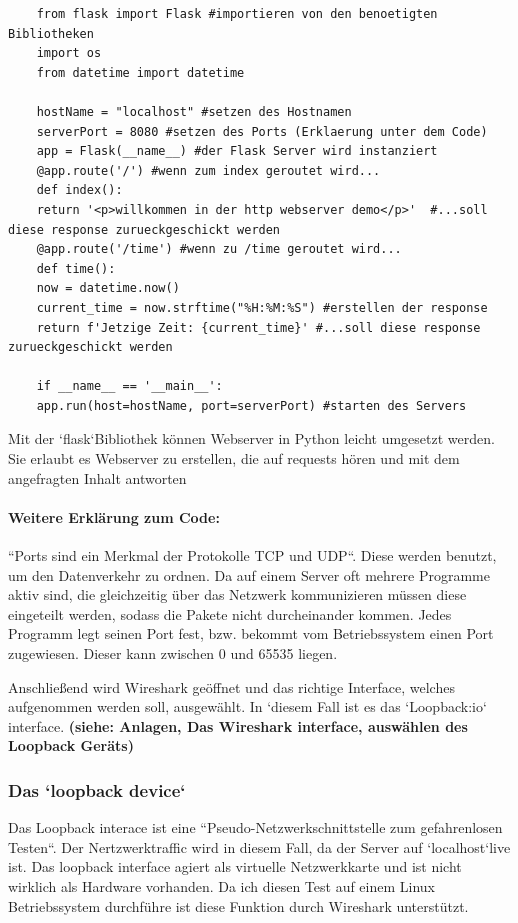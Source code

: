 \documentclass[12pt]{article}
\begin{document}
\begin{lstlisting}
	from flask import Flask #importieren von den benoetigten Bibliotheken
	import os
	from datetime import datetime
	
	hostName = "localhost" #setzen des Hostnamen
	serverPort = 8080 #setzen des Ports (Erklaerung unter dem Code)
	app = Flask(__name__) #der Flask Server wird instanziert
	@app.route('/') #wenn zum index geroutet wird...
	def index():
	return '<p>willkommen in der http webserver demo</p>'  #...soll diese response zurueckgeschickt werden
	@app.route('/time') #wenn zu /time geroutet wird...
	def time():
	now = datetime.now()
	current_time = now.strftime("%H:%M:%S") #erstellen der response
	return f'Jetzige Zeit: {current_time}' #...soll diese response zurueckgeschickt werden
	
	if __name__ == '__main__':
	app.run(host=hostName, port=serverPort) #starten des Servers
\end{lstlisting}

Mit der `flask`Bibliothek können Webserver in Python leicht umgesetzt werden. Sie erlaubt es Webserver zu erstellen, die auf requests hören und mit dem angefragten Inhalt antworten\cite{flask}

\paragraph{Weitere Erklärung zum Code:}
``Ports sind ein Merkmal der Protokolle TCP und UDP``\cite{ports19}. Diese werden benutzt, um den Datenverkehr zu ordnen. Da auf einem Server oft mehrere Programme aktiv sind, die gleichzeitig über das Netzwerk kommunizieren müssen diese eingeteilt werden, sodass die Pakete nicht durcheinander kommen. Jedes Programm legt seinen Port fest, bzw. bekommt vom Betriebssystem einen Port zugewiesen. Dieser kann zwischen 0 und 65535 liegen.\cite{ports}

Anschließend wird Wireshark geöffnet und das richtige Interface, welches aufgenommen werden soll, ausgewählt. In `diesem Fall ist es das `Loopback:io` interface. \textbf{(siehe: Anlagen, Das Wireshark interface, auswählen des Loopback Geräts)}
\subsubsection{Das `loopback device`}

Das Loopback interace ist eine ``Pseudo-Netzwerkschnittstelle zum gefahrenlosen Testen``\cite{loopback-munich}. Der Nertzwerktraffic wird in diesem Fall, da der Server auf `localhost`live ist. Das loopback interface agiert als virtuelle Netzwerkkarte und ist nicht wirklich als Hardware vorhanden. Da ich diesen Test auf einem Linux Betriebssystem durchführe ist diese Funktion durch Wireshark unterstützt.\cite{loopback-wireshark}
\end{document}
